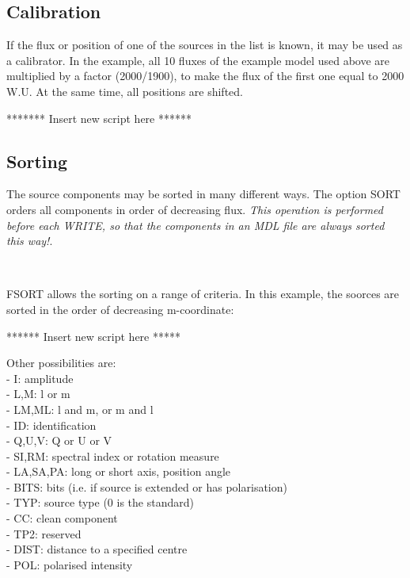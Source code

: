 \sdefault{ = $\ast$:}
\suser{*}

\newpage
\subsection{Calibration}
\label{mdl.descr.handle-calib}

If the flux or position of one of the sources in the list is known, it may
be used as a calibrator. In the example, all 10 fluxes of the example model
used above are multiplied by a factor (2000/1900), to make the flux of the
first one equal to 2000 W.U. At the same time, all positions are shifted.


******* Insert new script here ******


\newpage
\subsection{Sorting}
\label{mdl.descr.handle-sort}

The source components may be sorted in many different ways. The option 
SORT orders all components in order of decreasing flux.
{\it This operation is performed before each WRITE, so that the components
in an MDL file are always sorted this way!}.

~

FSORT allows the sorting on a range of criteria. In this example, the soorces
are sorted in the order of decreasing m-coordinate:


****** Insert new script here *****


Other possibilities are:
~\\- I:  amplitude
~\\- L,M:  l or m
~\\- LM,ML:  l and m, or m and l
~\\- ID:  identification
~\\- Q,U,V:  Q or U or V
~\\- SI,RM:  spectral index or rotation measure
~\\- LA,SA,PA: long or short axis, position angle
~\\- BITS:  bits (i.e. if source is extended or has polarisation)
~\\- TYP:  source type (0 is the standard)
~\\- CC:  clean component
~\\- TP2:  reserved
~\\- DIST:  distance to a specified centre
~\\- POL:  polarised intensity


